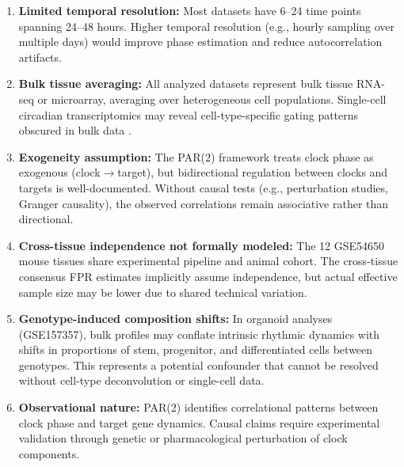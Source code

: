 \documentclass[11pt,a4paper]{article}
\begin{document}
\begin{enumerate}
    \item \textbf{Limited temporal resolution:} Most datasets have 6--24 time points spanning 24--48 hours. Higher temporal resolution (e.g., hourly sampling over multiple days) would improve phase estimation and reduce autocorrelation artifacts.
    
    \item \textbf{Bulk tissue averaging:} All analyzed datasets represent bulk tissue RNA-seq or microarray, averaging over heterogeneous cell populations. Single-cell circadian transcriptomics may reveal cell-type-specific gating patterns obscured in bulk data \citep{droin2019space}.
    
    \item \textbf{Exogeneity assumption:} The PAR(2) framework treats clock phase as exogenous (clock$\rightarrow$target), but bidirectional regulation between clocks and targets is well-documented. Without causal tests (e.g., perturbation studies, Granger causality), the observed correlations remain associative rather than directional.
    
    \item \textbf{Cross-tissue independence not formally modeled:} The 12 GSE54650 mouse tissues share experimental pipeline and animal cohort. The cross-tissue consensus FPR estimates implicitly assume independence, but actual effective sample size may be lower due to shared technical variation.
    
    \item \textbf{Genotype-induced composition shifts:} In organoid analyses (GSE157357), bulk profiles may conflate intrinsic rhythmic dynamics with shifts in proportions of stem, progenitor, and differentiated cells between genotypes. This represents a potential confounder that cannot be resolved without cell-type deconvolution or single-cell data.
    
    \item \textbf{Observational nature:} PAR(2) identifies correlational patterns between clock phase and target gene dynamics. Causal claims require experimental validation through genetic or pharmacological perturbation of clock components.
    

\end{enumerate}
\end{document}
